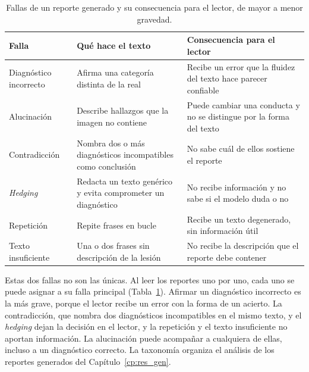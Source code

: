 \begin{table}[H]
    \centering
    \caption{Fallas de un reporte generado y su consecuencia para el lector, de mayor a menor gravedad.}
    \label{tab:marco_fallas}
    \small
    \begin{tabularx}{\textwidth}{@{}>{\raggedright\arraybackslash}p{3.0cm}
        >{\raggedright\arraybackslash\hspace{0pt}}X >{\raggedright\arraybackslash\hspace{0pt}}X@{}}
        \toprule
        \textbf{Falla} & \textbf{Qué hace el texto} & \textbf{Consecuencia para el lector} \\
        \midrule
        Diagnóstico incorrecto & Afirma una categoría distinta de la real
            & Recibe un error que la fluidez del texto hace parecer confiable \\
        \filasep
        Alucinación & Describe hallazgos que la imagen no contiene
            & Puede cambiar una conducta y no se distingue por la forma del texto \\
        \filasep
        Contradicción & Nombra dos o más diagnósticos incompatibles como conclusión
            & No sabe cuál de ellos sostiene el reporte \\
        \filasep
        \emph{Hedging} & Redacta un texto genérico y evita comprometer un diagnóstico
            & No recibe información y no sabe si el modelo duda o no \\
        \filasep
        Repetición & Repite frases en bucle~\cite{holtzman2020curious}
            & Recibe un texto degenerado, sin información útil \\
        \filasep
        Texto insuficiente & Una o dos frases sin descripción de la lesión
            & No recibe la descripción que el reporte debe contener \\
        \bottomrule
    \end{tabularx}
\end{table}

Estas dos fallas no son las únicas. Al leer los reportes uno por uno, cada uno se puede asignar a su falla
principal (Tabla~\ref{tab:marco_fallas}). Afirmar un diagnóstico incorrecto es la más grave, porque el lector
recibe un error con la forma de un acierto. La contradicción, que nombra dos diagnósticos incompatibles en el
mismo texto, y el \emph{hedging} dejan la decisión en el lector, y la repetición y el texto insuficiente no
aportan información. La alucinación puede acompañar a cualquiera de ellas, incluso a un diagnóstico correcto.
La taxonomía organiza el análisis de los reportes generados del Capítulo~\ref{cp:res_gen}.

